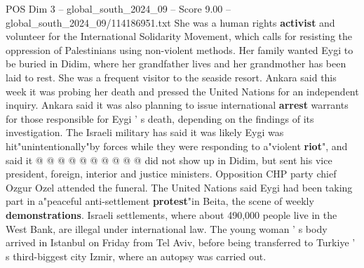 \begin{textsample}{POS Dim 3 – global\_south\_2024\_09 – Score 9.00 – global\_south\_2024\_09/114186951.txt}
She was a human rights \textbf{activist} and volunteer for the International Solidarity Movement, which calls for resisting the oppression of Palestinians using non-violent methods.
Her family wanted Eygi to be buried in Didim, where her grandfather lives and her grandmother has been laid to rest.
She was a frequent visitor to the seaside resort.
Ankara said this week it was probing her death and pressed the United Nations for an independent inquiry.
Ankara said it was also planning to issue international \textbf{arrest} warrants for those responsible for Eygi ' s death, depending on the findings of its investigation.
The Israeli military has said it was likely Eygi was hit"unintentionally"by forces while they were responding to a"violent \textbf{riot}", and said it @ @ @ @ @ @ @ @ @ @ did not show up in Didim, but sent his vice president, foreign, interior and justice ministers.
Opposition CHP party chief Ozgur Ozel attended the funeral.
The United Nations said Eygi had been taking part in a"peaceful anti-settlement \textbf{protest}"in Beita, the scene of weekly \textbf{demonstrations}.
Israeli settlements, where about 490,000 people live in the West Bank, are illegal under international law.
The young woman ' s body arrived in Istanbul on Friday from Tel Aviv, before being transferred to Turkiye ' s third-biggest city Izmir, where an autopsy was carried out.

\end{textsample}
